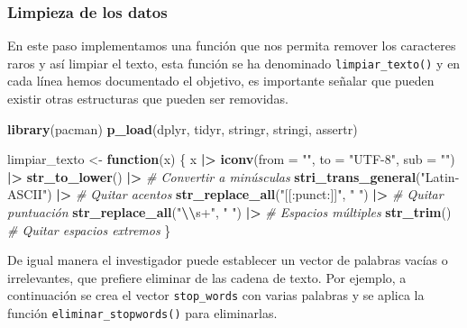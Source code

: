 \documentclass[
  12pt,
]{book}
\newenvironment{Shaded}{\begin{snugshade}}{\end{snugshade}}
\newcommand{\AttributeTok}[1]{\textcolor[rgb]{0.13,0.29,0.53}{#1}}
\newcommand{\CommentTok}[1]{\textcolor[rgb]{0.56,0.35,0.01}{\textit{#1}}}
\newcommand{\ControlFlowTok}[1]{\textcolor[rgb]{0.13,0.29,0.53}{\textbf{#1}}}
\newcommand{\FunctionTok}[1]{\textcolor[rgb]{0.13,0.29,0.53}{\textbf{#1}}}
\newcommand{\NormalTok}[1]{#1}
\newcommand{\OtherTok}[1]{\textcolor[rgb]{0.56,0.35,0.01}{#1}}
\newcommand{\SpecialCharTok}[1]{\textcolor[rgb]{0.81,0.36,0.00}{\textbf{#1}}}
\newcommand{\StringTok}[1]{\textcolor[rgb]{0.31,0.60,0.02}{#1}}
\begin{document}
\subsubsection{Limpieza de los datos}\label{limpieza-de-los-datos}

En este paso implementamos una función que nos permita remover los caracteres raros y así limpiar el texto, esta función se ha denominado \texttt{limpiar\_texto()} y en cada línea hemos documentado el objetivo, es importante señalar que pueden existir otras estructuras que pueden ser removidas.

\begin{Shaded}
\begin{Highlighting}[]
\FunctionTok{library}\NormalTok{(pacman)}
\FunctionTok{p\_load}\NormalTok{(dplyr, tidyr, stringr, stringi, assertr)}

\NormalTok{limpiar\_texto }\OtherTok{\textless{}{-}} \ControlFlowTok{function}\NormalTok{(x) \{}
\NormalTok{  x }\SpecialCharTok{|\textgreater{}} 
    \FunctionTok{iconv}\NormalTok{(}\AttributeTok{from =} \StringTok{""}\NormalTok{, }\AttributeTok{to =} \StringTok{"UTF{-}8"}\NormalTok{, }\AttributeTok{sub =} \StringTok{""}\NormalTok{) }\SpecialCharTok{|\textgreater{}} 
    \FunctionTok{str\_to\_lower}\NormalTok{() }\SpecialCharTok{|\textgreater{}}                            \CommentTok{\# Convertir a minúsculas}
    \FunctionTok{stri\_trans\_general}\NormalTok{(}\StringTok{"Latin{-}ASCII"}\NormalTok{) }\SpecialCharTok{|\textgreater{}}         \CommentTok{\# Quitar acentos}
    \FunctionTok{str\_replace\_all}\NormalTok{(}\StringTok{"[[:punct:]]"}\NormalTok{, }\StringTok{" "}\NormalTok{) }\SpecialCharTok{|\textgreater{}}       \CommentTok{\# Quitar puntuación}
    \FunctionTok{str\_replace\_all}\NormalTok{(}\StringTok{"}\SpecialCharTok{\textbackslash{}\textbackslash{}}\StringTok{s+"}\NormalTok{, }\StringTok{" "}\NormalTok{) }\SpecialCharTok{|\textgreater{}}              \CommentTok{\# Espacios múltiples}
    \FunctionTok{str\_trim}\NormalTok{()                                   }\CommentTok{\# Quitar espacios extremos}
\NormalTok{\}}
\end{Highlighting}
\end{Shaded}

De igual manera el investigador puede establecer un vector de palabras vacías o irrelevantes, que prefiere eliminar de las cadena de texto. Por ejemplo, a continuación se crea el vector \texttt{stop\_words} con varias palabras y se aplica la función \texttt{eliminar\_stopwords()} para eliminarlas.
\end{document}
